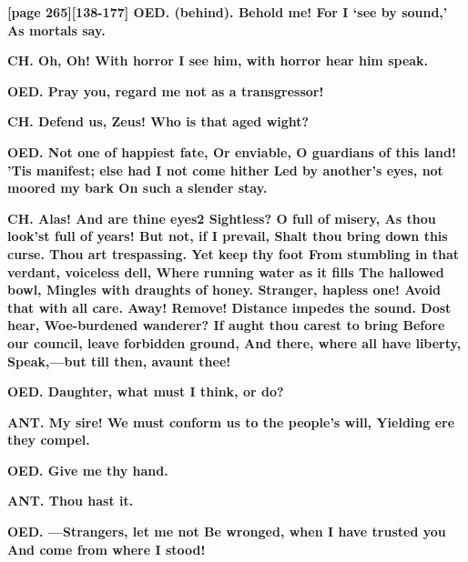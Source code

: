 \documentclass[11pt,letter]{book}
\begin{document}
\par \textbf{[page 265][138-177] OED. (behind). Behold me! For I ‘see by sound,’ As mortals say.}
\par 

\par \textbf{CH. Oh, Oh! With horror I see him, with horror hear him speak.}
\par 

\par \textbf{OED. Pray you, regard me not as a transgressor!}
\par 

\par \textbf{CH. Defend us, Zeus! Who is that aged wight?}
\par 

\par \textbf{OED. Not one of happiest fate, Or enviable, O guardians of this land! ’Tis manifest; else had I not come hither Led by another’s eyes, not moored my bark On such a slender stay.}
\par 

\par \textbf{CH. Alas! And are thine eyes2 Sightless? O full of misery, As thou look’st full of years! But not, if I prevail, Shalt thou bring down this curse. Thou art trespassing. Yet keep thy foot From stumbling in that verdant, voiceless dell, Where running water as it fills The hallowed bowl, Mingles with draughts of honey. Stranger, hapless one! Avoid that with all care. Away! Remove! Distance impedes the sound. Dost hear, Woe-burdened wanderer? If aught thou carest to bring Before our council, leave forbidden ground, And there, where all have liberty, Speak,—but till then, avaunt thee!}
\par 

\par \textbf{OED. Daughter, what must I think, or do?}
\par 

\par \textbf{ANT. My sire! We must conform us to the people’s will, Yielding ere they compel.}
\par 

\par \textbf{OED. Give me thy hand.}
\par 

\par \textbf{ANT. Thou hast it.}
\par 

\par \textbf{OED. —Strangers, let me not Be wronged, when I have trusted you And come from where I stood!}
\par 
\end{document}
